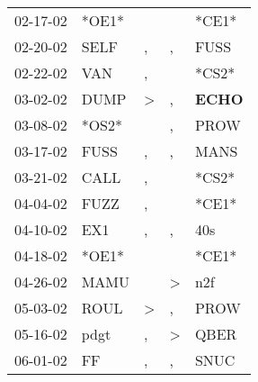 \begin{supertabular}{p{0.07\textwidth}p{0.06\textwidth}p{0.02\textwidth}p{0.02\textwidth}p{0.06\textwidth}}
          02-17-02\textsuperscript{} &                            *OE1* &                  &                  &                            *CE1* \\
          02-20-02\textsuperscript{} &           SELF\textsuperscript{} &                , &                , &           FUSS\textsuperscript{} \\
          02-22-02\textsuperscript{} &            VAN\textsuperscript{} &                , &                  &                            *CS2* \\
          03-02-02\textsuperscript{} &           DUMP\textsuperscript{} &     \textgreater &                , &  \textbf{ECHO\textsuperscript{}} \\
          03-08-02\textsuperscript{} &                            *OS2* &                  &                , &           PROW\textsuperscript{} \\
          03-17-02\textsuperscript{} &           FUSS\textsuperscript{} &                , &                , &           MANS\textsuperscript{} \\
          03-21-02\textsuperscript{} &           CALL\textsuperscript{} &                , &                  &                            *CS2* \\
          04-04-02\textsuperscript{} &           FUZZ\textsuperscript{} &                , &                  &                            *CE1* \\
          04-10-02\textsuperscript{} &            EX1\textsuperscript{} &                , &                , &            40s\textsuperscript{} \\
          04-18-02\textsuperscript{} &                            *OE1* &                  &                  &                            *CE1* \\
          04-26-02\textsuperscript{} &           MAMU\textsuperscript{} &                  &     \textgreater &            n2f\textsuperscript{} \\
          05-03-02\textsuperscript{} &           ROUL\textsuperscript{} &     \textgreater &                , &           PROW\textsuperscript{} \\
          05-16-02\textsuperscript{} &           pdgt\textsuperscript{} &                , &     \textgreater &           QBER\textsuperscript{} \\
          06-01-02\textsuperscript{} &             FF\textsuperscript{} &                , &                , &           SNUC\textsuperscript{} \\

\end{supertabular}
